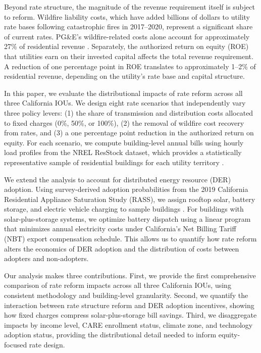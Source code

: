 \documentclass[9pt,twocolumn,twoside]{pnas-new}
\begin{document}
Beyond rate structure, the magnitude of the revenue requirement itself is subject to reform. Wildfire liability costs, which have added billions of dollars to utility rate bases following catastrophic fires in 2017--2020, represent a significant share of current rates. PG\&E's wildfire-related costs alone account for approximately 27\% of residential revenue \cite{CPUC_AB205_Factsheet}. Separately, the authorized return on equity (ROE) that utilities earn on their invested capital affects the total revenue requirement. A reduction of one percentage point in ROE translates to approximately 1--2\% of residential revenue, depending on the utility's rate base and capital structure.

In this paper, we evaluate the distributional impacts of rate reform across all three California IOUs. We design eight rate scenarios that independently vary three policy levers: (1) the share of transmission and distribution costs allocated to fixed charges (0\%, 50\%, or 100\%), (2) the removal of wildfire cost recovery from rates, and (3) a one percentage point reduction in the authorized return on equity. For each scenario, we compute building-level annual bills using hourly load profiles from the NREL ResStock dataset, which provides a statistically representative sample of residential buildings for each utility territory \cite{resstock2024}.

We extend the analysis to account for distributed energy resource (DER) adoption. Using survey-derived adoption probabilities from the 2019 California Residential Appliance Saturation Study (RASS), we assign rooftop solar, battery storage, and electric vehicle charging to sample buildings \cite{rass2019}. For buildings with solar-plus-storage systems, we optimize battery dispatch using a linear program that minimizes annual electricity costs under California's Net Billing Tariff (NBT) export compensation schedule. This allows us to quantify how rate reform alters the economics of DER adoption and the distribution of costs between adopters and non-adopters.

Our analysis makes three contributions. First, we provide the first comprehensive comparison of rate reform impacts across all three California IOUs, using consistent methodology and building-level granularity. Second, we quantify the interaction between rate structure reform and DER adoption incentives, showing how fixed charges compress solar-plus-storage bill savings. Third, we disaggregate impacts by income level, CARE enrollment status, climate zone, and technology adoption status, providing the distributional detail needed to inform equity-focused rate design.
\end{document}

